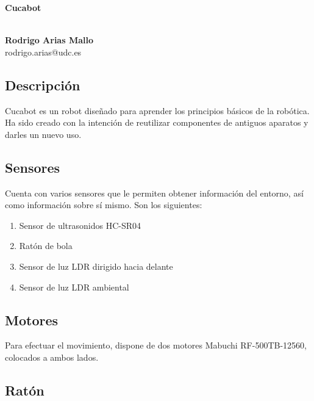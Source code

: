 \documentclass[10pt,a4paper,hidelinks]{article}
\begin{document}
\begin{center}
\begin{huge}
\textbf{Cucabot}
\end{huge}
\\[10pt]
\textbf{Rodrigo Arias Mallo}\\
rodrigo.arias@udc.es
\end{center}

\newcommand\RobotAngle{45}
\newcommand\RobotSize{2}
\newcommand\RobotRadius{4}
\newcommand\RobotThetaSonar{60.0}

\begin{multicols}{2}

\section{Descripción}
Cucabot es un robot diseñado para aprender los principios básicos de la robótica.
Ha sido creado con la intención de reutilizar componentes de antiguos aparatos y 
darles un nuevo uso.

\subsection{Sensores}
Cuenta con varios sensores que le permiten obtener información del entorno, así
como información sobre sí mismo. Son los siguientes:

\begin{enumerate}
	\setlength{\parskip}{0cm}

	\item Sensor de ultrasonidos HC-SR04
	\item Ratón de bola
	\item Sensor de luz LDR dirigido hacia delante
	\item Sensor de luz LDR ambiental
\end{enumerate}

\subsection{Motores}
Para efectuar el movimiento, dispone de dos motores Mabuchi RF-500TB-12560, colocados
a ambos lados.

\subsection{Ratón}


\end{multicols}
\end{document}
